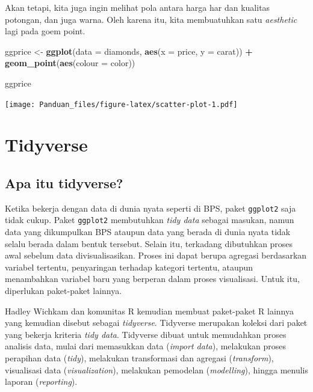 \documentclass[]{book}
\newenvironment{Shaded}{\begin{snugshade}}{\end{snugshade}}
\newcommand{\KeywordTok}[1]{\textcolor[rgb]{0.13,0.29,0.53}{\textbf{#1}}}
\newcommand{\DataTypeTok}[1]{\textcolor[rgb]{0.13,0.29,0.53}{#1}}
\newcommand{\StringTok}[1]{\textcolor[rgb]{0.31,0.60,0.02}{#1}}
\newcommand{\OperatorTok}[1]{\textcolor[rgb]{0.81,0.36,0.00}{\textbf{#1}}}
\newcommand{\NormalTok}[1]{#1}
\begin{document}
Akan tetapi, kita juga ingin melihat pola antara harga har dan kualitas
potongan, dan juga warna. Oleh karena itu, kita membuatuhkan satu
\emph{aesthetic} lagi pada goem point.

\begin{Shaded}
\begin{Highlighting}[]
\NormalTok{ggprice <-}\StringTok{ }\KeywordTok{ggplot}\NormalTok{(}\DataTypeTok{data =}\NormalTok{ diamonds, }\KeywordTok{aes}\NormalTok{(}\DataTypeTok{x =}\NormalTok{ price, }\DataTypeTok{y =}\NormalTok{ carat)) }\OperatorTok{+}
\StringTok{        }\KeywordTok{geom_point}\NormalTok{(}\KeywordTok{aes}\NormalTok{(}\DataTypeTok{colour =}\NormalTok{ color))}

\NormalTok{ggprice}
\end{Highlighting}
\end{Shaded}

\texttt{[image: Panduan\_files/figure-latex/scatter-plot-1.pdf]}

\chapter{Tidyverse}\label{tidyverse}

\section{Apa itu tidyverse?}\label{apa-itu-tidyverse}

Ketika bekerja dengan data di dunia nyata seperti di BPS, paket
\texttt{ggplot2} saja tidak cukup. Paket \texttt{ggplot2} membutuhkan
\emph{tidy data} sebagai masukan, namun data yang dikumpulkan BPS
ataupun data yang berada di dunia nyata tidak selalu berada dalam bentuk
tersebut. Selain itu, terkadang dibutuhkan proses awal sebelum data
divisualisasikan. Proses ini dapat berupa agregasi berdasarkan variabel
tertentu, penyaringan terhadap kategori tertentu, ataupun menambahkan
variabel baru yang berperan dalam proses visualisasi. Untuk itu,
diperlukan paket-paket lainnya.

Hadley Wichkam dan komunitas R kemudian membuat paket-paket R lainnya
yang kemudian disebut sebagai \emph{tidyverse}. Tidyverse merupakan
koleksi dari paket yang bekerja kriteria \emph{tidy data}. Tidyverse
dibuat untuk memudahkan proses analisis data, mulai dari memasukkan data
(\emph{import data}), melakukan proses perapihan data (\emph{tidy}),
melakukan transformasi dan agregasi (\emph{transform}), visualisasi data
(\emph{visualization}), melakukan pemodelan (\emph{modelling}), hingga
menulis laporan (\emph{reporting}).
\end{document}
